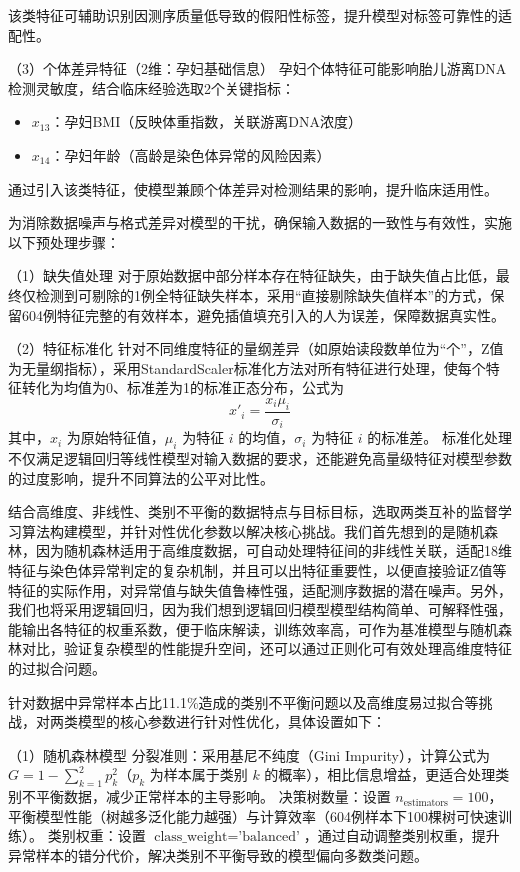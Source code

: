 \documentclass[withoutpreface,bwprint]{cumcmthesis} %
\begin{document}
该类特征可辅助识别因测序质量低导致的假阳性标签，提升模型对标签可靠性的适配性。

（3）个体差异特征（2维：孕妇基础信息）  
孕妇个体特征可能影响胎儿游离DNA检测灵敏度，结合临床经验选取2个关键指标：  
\begin{itemize}
    \item $ x_{13} $：孕妇BMI（反映体重指数，关联游离DNA浓度）
    \item $ x_{14} $：孕妇年龄（高龄是染色体异常的风险因素）
\end{itemize}

通过引入该类特征，使模型兼顾个体差异对检测结果的影响，提升临床适用性。

为消除数据噪声与格式差异对模型的干扰，确保输入数据的一致性与有效性，实施以下预处理步骤：  

（1）缺失值处理  
对于原始数据中部分样本存在特征缺失，由于缺失值占比低，最终仅检测到可剔除的1例全特征缺失样本，采用“直接剔除缺失值样本”的方式，保留604例特征完整的有效样本，避免插值填充引入的人为误差，保障数据真实性。  

（2）特征标准化  
针对不同维度特征的量纲差异（如原始读段数单位为“个”，Z值为无量纲指标），采用StandardScaler标准化方法对所有特征进行处理，使每个特征转化为均值为0、标准差为1的标准正态分布，公式为
\begin{equation}
x'_i = \frac{x_{i} \mu_i}{\sigma_i}
\end{equation}
其中，$ x_i $ 为原始特征值，$ \mu_i $ 为特征 $ i $ 的均值，$ \sigma_i $ 为特征 $ i $ 的标准差。  
标准化处理不仅满足逻辑回归等线性模型对输入数据的要求，还能避免高量级特征对模型参数的过度影响，提升不同算法的公平对比性。

结合高维度、非线性、类别不平衡的数据特点与目标目标，选取两类互补的监督学习算法构建模型，并针对性优化参数以解决核心挑战。我们首先想到的是随机森林，因为随机森林适用于高维度数据，可自动处理特征间的非线性关联，适配18维特征与染色体异常判定的复杂机制，并且可以出特征重要性，以便直接验证Z值等特征的实际作用，对异常值与缺失值鲁棒性强，适配测序数据的潜在噪声。另外，我们也将采用逻辑回归，因为我们想到逻辑回归模型模型结构简单、可解释性强，能输出各特征的权重系数，便于临床解读，训练效率高，可作为基准模型与随机森林对比，验证复杂模型的性能提升空间，还可以通过正则化可有效处理高维度特征的过拟合问题。

针对数据中异常样本占比11.1\%造成的类别不平衡问题以及高维度易过拟合等挑战，对两类模型的核心参数进行针对性优化，具体设置如下：

（1）随机森林模型
分裂准则：采用基尼不纯度（Gini Impurity），计算公式为 $ G = 1 - \sum_{k=1}^2 p_k^2 $（$ p_k $ 为样本属于类别 $ k $ 的概率），相比信息增益，更适合处理类别不平衡数据，减少正常样本的主导影响。  
决策树数量：设置 $ n_{\text{estimators}} = 100 $，平衡模型性能（树越多泛化能力越强）与计算效率（604例样本下100棵树可快速训练）。  
类别权重：设置 $ \text{class\_weight} = \text{'balanced'} $，通过自动调整类别权重，提升异常样本的错分代价，解决类别不平衡导致的模型偏向多数类问题。  
\end{document}
